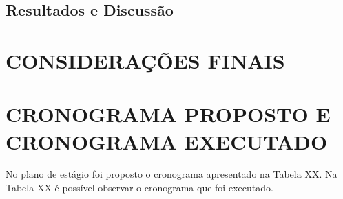 \documentclass[12pt]{article}
\begin{document}
\subsection{Resultados e Discussão}
\label{resultados_e_discussao}

\section{CONSIDERAÇÕES FINAIS}

\section{CRONOGRAMA PROPOSTO E CRONOGRAMA EXECUTADO}
No plano de estágio foi proposto o cronograma apresentado na Tabela XX. Na Tabela XX é possível observar o cronograma que foi executado.



\end{document}
